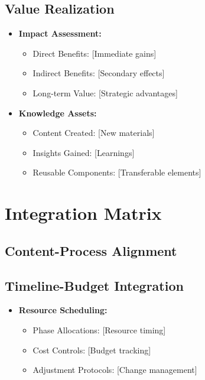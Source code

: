 \documentclass{article}
\begin{document}
\subsection{Value Realization}
\begin{itemize}
    \item \textbf{Impact Assessment:}
    \begin{itemize}
        \item Direct Benefits: [Immediate gains]
        \item Indirect Benefits: [Secondary effects]
        \item Long-term Value: [Strategic advantages]
    \end{itemize}

    \item \textbf{Knowledge Assets:}
    \begin{itemize}
        \item Content Created: [New materials]
        \item Insights Gained: [Learnings]
        \item Reusable Components: [Transferable elements]
    \end{itemize}
\end{itemize}
\section{Integration Matrix}
\subsection{Content-Process Alignment}
\subsection{Timeline-Budget Integration}
\begin{itemize}
    \item \textbf{Resource Scheduling:}
    \begin{itemize}
        \item Phase Allocations: [Resource timing]
        \item Cost Controls: [Budget tracking]
        \item Adjustment Protocols: [Change management]
    \end{itemize}
\end{itemize}
\end{document}
